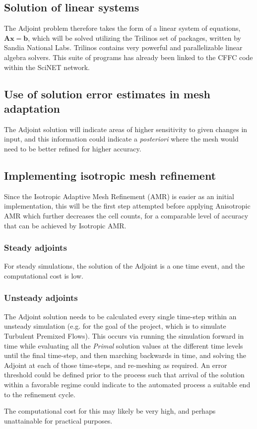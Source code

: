 \subsection{Solution of linear systems}
The Adjoint problem therefore takes the form of a linear system of equations, $\mathbf{Ax}=\mathbf{b}$, which will be solved utilizing the Trilinos set of packages, written by Sandia National Labs. Trilinos contains very powerful and parallelizable linear algebra solvers. This suite of programs has already been linked to the CFFC code within the SciNET network.

\subsection{Use of solution error estimates in mesh adaptation}
The Adjoint solution will indicate areas of higher sensitivity to given changes in input, and this information could indicate a \textit{posteriori} where the mesh would need to be better refined for higher accuracy.

\subsection{Implementing isotropic mesh refinement}
Since the Isotropic Adaptive Mesh Refinement (AMR) is easier as an initial implementation, this will be the first step attempted before applying Anisotropic AMR which further decreases the cell counts, for a comparable level of accuracy that can be achieved by Isotropic AMR.

\subsubsection{Steady adjoints}

For steady simulations, the solution of the Adjoint is a one time event, and the computational cost is low.

\subsubsection{Unsteady adjoints}
The Adjoint solution needs to be calculated every single time-step within an unsteady simulation (e.g. for the goal of the project, which is to simulate Turbulent Premixed Flows). This occurs via running the simulation forward in time while evaluating all the \textit{Primal} solution values at the different time levels until the final time-step, and then marching backwards in time, and solving the Adjoint at each of those time-steps, and re-meshing as required. An error threshold could be defined prior to the process such that arrival of the solution within a favorable regime could indicate to the automated process a suitable end to the refinement cycle.\par
The computational cost for this may likely be very high, and perhaps unattainable for practical purposes.\par


